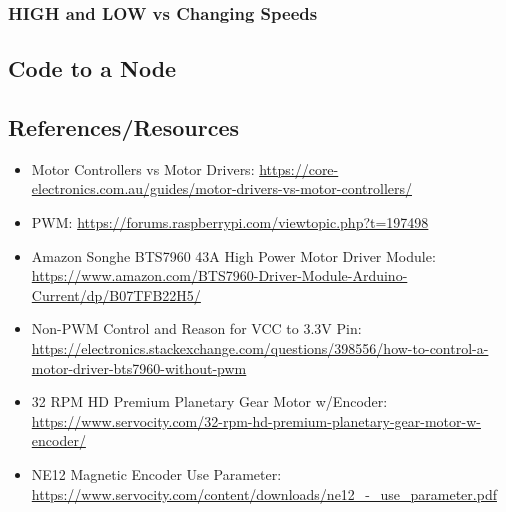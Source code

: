 \documentclass[a4paper, 10pt]{article}
\begin{document}
        \subsubsection{HIGH and LOW vs Changing Speeds}
            
    \subsection{Code to a Node}
         
    \subsection{References/Resources}
    \begin{itemize}
        \item Motor Controllers vs Motor Drivers: \url{https://core-electronics.com.au/guides/motor-drivers-vs-motor-controllers/}
        \item PWM: \url{https://forums.raspberrypi.com/viewtopic.php?t=197498}
        \item Amazon Songhe BTS7960 43A High Power Motor Driver Module: \\
        \url{https://www.amazon.com/BTS7960-Driver-Module-Arduino-Current/dp/B07TFB22H5/}
        \item Non-PWM Control and Reason for VCC to 3.3V Pin: \\ \url{https://electronics.stackexchange.com/questions/398556/how-to-control-a-motor-driver-bts7960-without-pwm}
        \item 32 RPM HD Premium Planetary Gear Motor w/Encoder: \url{https://www.servocity.com/32-rpm-hd-premium-planetary-gear-motor-w-encoder/}
        \item NE12 Magnetic Encoder Use Parameter: \\ \url{https://www.servocity.com/content/downloads/ne12_-_use_parameter.pdf}

    \end{itemize}
\end{document}
